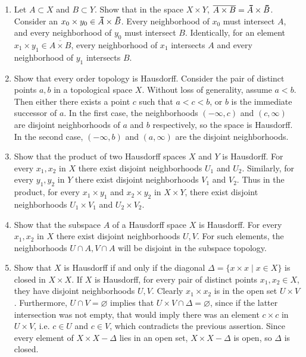 \documentclass[12pt,letterpaper]{article}
\newcommand{\n}{\break}
\let\emptyset\varnothing
\newcommand{\WLOG}{Without loss of generality}
\newcommand\thickbar[1]{\accentset{\rule{.4em}{.8pt}}{#1}}
\let\bar\thickbar
\begin{document}
\begin{enumerate}
\begin{enumerate}
  \end{enumerate}
  \item Let $A\subset X$ and $B\subset Y$. Show that in the space $X\times Y$, $\overline{A\times B}=\bar{A}\times\bar{B}$.\n
  \indent Consider an $x_0\times y_0\in \bar{A} \times \bar{B}$. Every neighborhood of $x_0$ must intersect $A$, and every neighborhood of $y_0$ must intersect $B$. Identically, for an element $x_1\times y_1\in\overline{A\times B}$, every neighborhood of $x_1$ intersects $A$ and every neighborhood of $y_1$ intersects $B$. 
  \item Show that every order topology is Hausdorff.\n
  \indent Consider the pair of distinct points $a,b$ in a topological space $X$. \WLOG, assume $a<b$. Then either there exists a point $c$ such that $a<c<b$, or $b$ is the immediate successor of $a$. In the first case, the neighborhoods $(-\infty, c)$ and $(c,\infty)$ are disjoint neighborhoods of $a$ and $b$ respectively, so the space is Hausdorff. In the second case, $(-\infty, b)$ and $(a,\infty)$ are the disjoint neighborhoods. 
  \item Show that the product of two Hausdorff spaces $X$ and $Y$ is Hausdorff.\n
  \indent For every $x_1,x_2$ in $X$ there exist disjoint neighborhoods $U_1$ and $U_2$. Similarly, for every $y_1,y_2$ in $Y$ there exist disjoint neighborhoods $V_1$ and $V_2$. Thus in the product, for every $x_1\times y_1$ and $x_2\times y_2$ in $X\times Y$, there exist disjoint neighborhoods $U_1\times V_1$ and $U_2\times V_2$.
  \item Show that the subspace $A$ of a Hausdorff space $X$ is Hausdorff.\n
  \indent For every $x_1,x_2$ in $X$ there exist disjoint neighborhoods $U,V$. For such elements, the neighborhoods $U\cap A, V\cap A$ will be disjoint in the subspace topology.
  \item Show that $X$ is Hausdorff if and only if the diagonal $\Delta = \{x\times x\; |\; x\in X\}$ is closed in $X\times X$.\hspace{5in}\n
  \indent If $X$ is Hausdorff, for every pair of distinct points $x_1,x_2\in X$, they have disjoint neighborhoods $U,V$. Clearly $x_1 \times x_2$ is in the open set $U\times V$. Furthermore, $U\cap V=\emptyset$ implies that $U\times V \cap \Delta=\emptyset$, since if the latter intersection was not empty, that would imply there was an element $c\times c$ in $U\times V$, i.e. $c\in U$ and $c\in V$, which contradicts the previous assertion. Since every element of $X\times X - \Delta$ lies in an open set, $X\times X - \Delta$ is open, so $\Delta$ is closed.\n

\end{enumerate}
\end{document}
